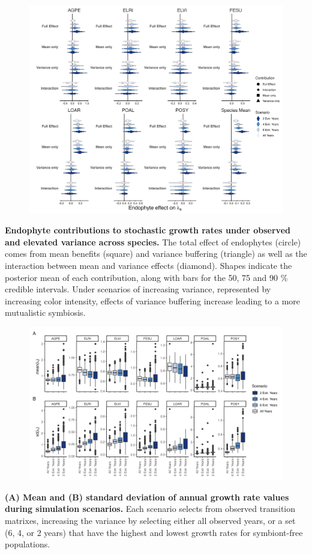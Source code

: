 \documentclass[12pt]{article}
\begin{document}
\begin{figure}
	\centering
	\includegraphics[width=\linewidth]{figS6_contributions_obs_plot.png}
\end{figure}
 \textbf{Endophyte contributions to stochastic growth rates under observed and elevated variance across species.} The total effect of endophytes (circle) comes from mean benefits (square) and variance buffering (triangle) as well as the interaction between mean and variance effects (diamond). Shapes indicate the posterior mean of each contribution, along with bars for the 50, 75 and 90 \% credible intervals.  Under scenarios of increasing variance, represented by increasing color intensity, effects of variance buffering increase leading to a more mutualistic symbiosis.
\newpage

\begin{figure}
	\centering
	\includegraphics[width=\linewidth]{figS7_sim_boxplots.png}
\end{figure}
 \textbf{(A) Mean and (B) standard deviation of annual growth rate values during simulation scenarios.} Each scenario selects from observed transition matrixes, increasing the variance by selecting either all observed years, or a set (6, 4, or 2 years) that have the highest and lowest growth rates for symbiont-free populations.
\newpage
\end{document}
